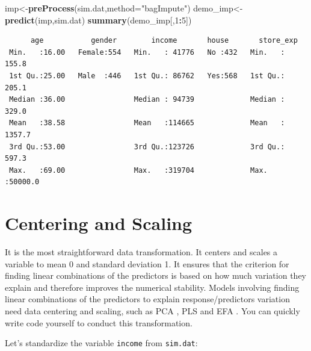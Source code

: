 \documentclass[12pt,]{krantz}
\makeatletter
\newenvironment{Shaded}{\begin{snugshade}}{\end{snugshade}}
\newcommand{\KeywordTok}[1]{\textcolor[rgb]{0.27,0.27,0.27}{\textbf{#1}}}
\newcommand{\DataTypeTok}[1]{\textcolor[rgb]{0.27,0.27,0.27}{#1}}
\newcommand{\DecValTok}[1]{\textcolor[rgb]{0.06,0.06,0.06}{#1}}
\newcommand{\StringTok}[1]{\textcolor[rgb]{0.5,0.5,0.5}{#1}}
\newcommand{\CommentTok}[1]{\textcolor[rgb]{0.37,0.37,0.37}{\textit{#1}}}
\newcommand{\OperatorTok}[1]{\textcolor[rgb]{0.43,0.43,0.43}{\textbf{#1}}}
\newcommand{\NormalTok}[1]{#1}
\newenvironment{kframe}{%
\medskip{}
\setlength{\fboxsep}{.8em}
 \def\at@end@of@kframe{}%
 \ifinner\ifhmode%
  \def\at@end@of@kframe{\end{minipage}}%
  \begin{minipage}{\columnwidth}%
 \fi\fi%
 \def\FrameCommand##1{\hskip\@totalleftmargin \hskip-\fboxsep
 \colorbox{shadecolor}{##1}\hskip-\fboxsep
     \hskip-\linewidth \hskip-\@totalleftmargin \hskip\columnwidth}%
 \MakeFramed {\advance\hsize-\width
   \@totalleftmargin\z@ \linewidth\hsize
   \@setminipage}}%
 {\par\unskip\endMakeFramed%
 \at@end@of@kframe}
\renewenvironment{Shaded}{\begin{kframe}}{\end{kframe}}
\theoremstyle{definition}
\theoremstyle{definition}
\theoremstyle{definition}
\theoremstyle{remark}
\makeatother
\begin{document}
\begin{Shaded}
\begin{Highlighting}[]
\NormalTok{imp<-}\KeywordTok{preProcess}\NormalTok{(sim.dat,}\DataTypeTok{method=}\StringTok{"bagImpute"}\NormalTok{)}
\NormalTok{demo_imp<-}\KeywordTok{predict}\NormalTok{(imp,sim.dat)}
\KeywordTok{summary}\NormalTok{(demo_imp[,}\DecValTok{1}\OperatorTok{:}\DecValTok{5}\NormalTok{])}
\end{Highlighting}
\end{Shaded}

\begin{verbatim}
      age           gender        income       house       store_exp      
 Min.   :16.00   Female:554   Min.   : 41776   No :432   Min.   :  155.8  
 1st Qu.:25.00   Male  :446   1st Qu.: 86762   Yes:568   1st Qu.:  205.1  
 Median :36.00                Median : 94739             Median :  329.0  
 Mean   :38.58                Mean   :114665             Mean   : 1357.7  
 3rd Qu.:53.00                3rd Qu.:123726             3rd Qu.:  597.3  
 Max.   :69.00                Max.   :319704             Max.   :50000.0  
\end{verbatim}

\section{Centering and Scaling}\label{centering-and-scaling}

It is the most straightforward data transformation. It centers and
scales a variable to mean 0 and standard deviation 1. It ensures that
the criterion for finding linear combinations of the predictors is based
on how much variation they explain and therefore improves the numerical
stability. Models involving finding linear combinations of the
predictors to explain response/predictors variation need data centering
and scaling, such as PCA \citep{pca1}, PLS \citep{PLS1} and EFA
\citep{EFA1}. You can quickly write code yourself to conduct this
transformation.

Let's standardize the variable \texttt{income} from \texttt{sim.dat}:

\begin{Shaded}
\end{Shaded}
\end{document}
